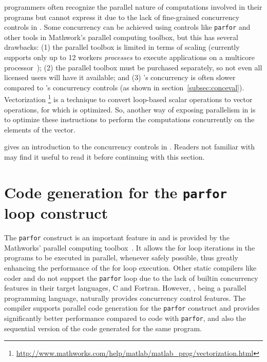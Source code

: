 \matlab programmers often recognize the parallel nature of computations involved
in their programs but cannot express it due to the lack of fine-grained
concurrency controls in \matlab. Some concurrency can be achieved using controls
like \verb|parfor| and other tools in Mathwork's parallel computing toolbox, but
this has several drawbacks:  (1) the parallel toolbox is limited in terms of
scaling (\matlab currently supports only up to 12 workers \emph{processes} to
execute applications on a multicore processor~\cite{pct}); (2) the parallel
toolbox must be purchased separately, so not even all licensed \matlab users
will have it available; and (3) \matlab's concurrency is often slower compared
to \xten's concurrency controls (as shown in section~\ref{subsec:conceval}).
Vectorization
\footnote{\url{http://www.mathworks.com/help/matlab/matlab_prog/vectorization.html}}
is a technique to convert loop-based scalar operations to vector operations, for
which \matlab is optimized.   So, another way of exposing parallelism in \matlab
is to optimize these instructions to perform the computations concurrently on
the elements of the vector.

 gives an introduction to the concurrency controls in \xten.
Readers not familiar with \xten may find it useful to read it before continuing
with this section.



\section{Code generation for the \matlab \texttt{parfor} loop construct}

The \matlab \texttt{parfor} construct is an important feature in \matlab and is
provided by the Mathworks' parallel computing toolbox~\cite{pct}. It allows the
for loop iterations in the \matlab programs to be executed in parallel, whenever
safely possible, thus greatly enhancing the performance of the for loop
execution. Other static \matlab compilers like \matlab coder and \mctwofor do
not support the \texttt{parfor} loop due to the lack of builtin concurrency
features in their target languages, C and Fortran. However, \xten, being a
parallel programming language, naturally provides concurrency control features.
The \mixten compiler supports parallel code generation for the \matlab
\texttt{parfor} construct and provides significantly better performance compared
to \matlab code with \texttt{parfor}, and also the sequential version of the
\xten code generated for the same program.   

